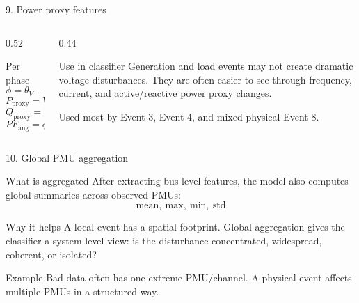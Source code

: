 \documentclass[10pt,aspectratio=169]{beamer}
\begin{document}
\begin{frame}{9. Power proxy features}
\small
\begin{columns}[T,totalwidth=\textwidth]
\begin{column}{0.52\textwidth}
\begin{block}{Per phase}
\[
\phi = \theta_V - \theta_I
\]
\[
P_{\mathrm{proxy}} = V_{\mathrm{pu}} I_{\mathrm{pu}} \cos(\phi)
\]
\[
Q_{\mathrm{proxy}} = V_{\mathrm{pu}} I_{\mathrm{pu}} \sin(\phi)
\]
\[
PF_{\mathrm{ang}} = \phi
\]
\end{block}
\end{column}
\begin{column}{0.44\textwidth}
\begin{exampleblock}{Use in classifier}
Generation and load events may not create dramatic voltage disturbances. They are often easier to see through frequency, current, and active/reactive power proxy changes.
\end{exampleblock}
\begin{alertblock}{Used most by}
Event 3, Event 4, and mixed physical Event 8.
\end{alertblock}
\end{column}
\end{columns}
\end{frame}

\begin{frame}{10. Global PMU aggregation}
\small
\begin{block}{What is aggregated}
After extracting bus-level features, the model also computes global summaries across observed PMUs:
\[
\mathrm{mean},\ \mathrm{max},\ \mathrm{min},\ \mathrm{std}
\]
\end{block}
\begin{exampleblock}{Why it helps}
A local event has a spatial footprint. Global aggregation gives the classifier a system-level view: is the disturbance concentrated, widespread, coherent, or isolated?
\end{exampleblock}
\begin{alertblock}{Example}
Bad data often has one extreme PMU/channel. A physical event affects multiple PMUs in a structured way.
\end{alertblock}
\end{frame}
\end{document}
